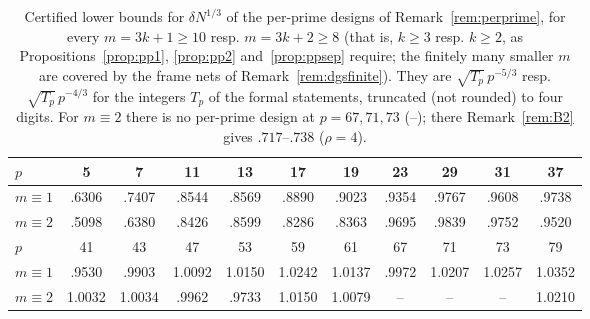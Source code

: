 \documentclass[11pt]{amsart}
\theoremstyle{definition}
\theoremstyle{plain}
\begin{document}
\begin{table}[tbp]
\centering\small\setlength{\tabcolsep}{3.2pt}
\begin{tabular}{@{}lcccccccccc@{}}
\toprule
$p$ & 5 & 7 & 11 & 13 & 17 & 19 & 23 & 29 & 31 & 37\\
\midrule
$m\equiv1$ & .6306 & .7407 & .8544 & .8569 & .8890 & .9023 & .9354 & .9767 & .9608 & .9738\\
$m\equiv2$ & .5098 & .6380 & .8426 & .8599 & .8286 & .8363 & .9695 & .9839 & .9752 & .9520\\
\midrule
$p$ & 41 & 43 & 47 & 53 & 59 & 61 & 67 & 71 & 73 & 79\\
\midrule
$m\equiv1$ & .9530 & .9903 & 1.0092 & 1.0150 & 1.0242 & 1.0137 & .9972 & 1.0207 & 1.0257 & 1.0352\\
$m\equiv2$ & 1.0032 & 1.0034 & .9962 & .9733 & 1.0150 & 1.0079 & -- & -- & -- & 1.0210\\
\bottomrule
\end{tabular}
\medskip
\caption{Certified lower bounds for $\delta N^{1/3}$ of the per-prime designs of Remark~\ref{rem:perprime}, for every $m=3k+1\ge10$ resp. $m=3k+2\ge8$ (that is, $k\ge3$ resp. $k\ge2$, as Propositions~\ref{prop:pp1}, \ref{prop:pp2} and~\ref{prop:ppsep} require; the finitely many smaller $m$ are covered by the frame nets of Remark~\ref{rem:dgsfinite}). They are $\sqrt{T_p}\,p^{-5/3}$ resp. $\sqrt{T_p}\,p^{-4/3}$ for the integers $T_p$ of the formal statements, truncated (not rounded) to four digits. For $m\equiv2$ there is no per-prime design at $p=67,71,73$ (--); there Remark~\ref{rem:B2} gives $.717$--$.738$ ($\rho=4$).}
\label{tab:perprime}
\end{table}
\end{document}
